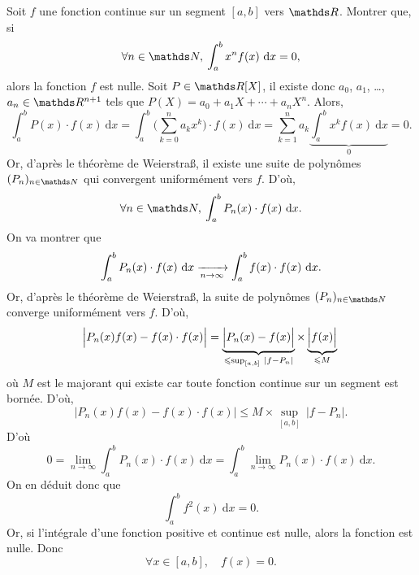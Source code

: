 \begin{thm}
	Soit $f$\/ une fonction continue sur un segment $[a,b]$\/ vers $\R$.
	Montrer que, si \[\forall n \in \N,\:\int_{a}^{b} x^n f(x)~\mathrm{d}x = 0,\] alors la fonction $f$\/ est nulle.
	Soit $P \in \R[X]$, il existe donc $a_0$, $a_1$, \ldots, $a_n \in \R^{n+1}$\/ tels que $P(X) = a_0 + a_1 X + \cdots + a_n X^n$. Alors, \[
		\int_{a}^{b} P(x)\cdot f(x)~\mathrm{d}x = \int_{a}^{b} \Big(\sum_{k=0}^n a_k x^k \Big) \cdot f(x)~\mathrm{d}x = \sum_{k=1}^n a_k \underbrace{\int_{a}^{b} x^k f(x)~\mathrm{d}x}_{0} = 0
	.\] Or, d'après le théorème de {\sc Weierstra\ss}, il existe une suite de polynômes $(P_n)_{n\in\N}$\/ qui convergent uniformément vers $f$. D'où, \[
		\forall n \in \N,\: \int_{a}^{b} P_n(x)\cdot f(x)~\mathrm{d}x
	.\] On va montrer que \[
		\int_{a}^{b} P_n(x) \cdot f(x)~\mathrm{d}x \tendsto{n\to \infty} \int_{a}^{b} f(x)\cdot f(x)~\mathrm{d}x.
	\] Or, d'après le théorème de {\sc Weierstra\ss}, la suite de polynômes $(P_n)_{n\in\N}$\/ converge uniformément vers $f$. D'où,
	\[
		\Big|P_n(x) f(x) - f(x) \cdot f(x)\Big|
		= \underbrace{\Big|P_n(x) - f(x)\Big|}_{\le \sup_{[a,b]}\:|f - P_n|} \times \underbrace{\Big|f(x)\Big|}_{\le M} \\
	\] 
	où $M$\/ est le majorant qui existe car toute fonction continue sur un segment est bornée. D'où, \[
		\Big|P_n(x) f(x) - f(x) \cdot f(x)\Big| \le M \times \sup_{[a,b]}\:|f - P_n|
	.\]
	D'où \[
		0 = \lim_{n\to \infty}\int_{a}^{b} P_n(x)\cdot f(x)~\mathrm{d}x = \int_{a}^{b} \lim_{n\to \infty} P_n(x)\cdot f(x)~\mathrm{d}x
	.\] On en déduit donc que \[
		\int_{a}^{b} f^2(x)~\mathrm{d}x = 0
	.\] Or, si l'intégrale d'une fonction positive {\color{red}et continue} est nulle, alors la fonction est nulle. Donc \[
		\forall x \in [a,b],\quad f(x) = 0
	.\]
\end{thm}

